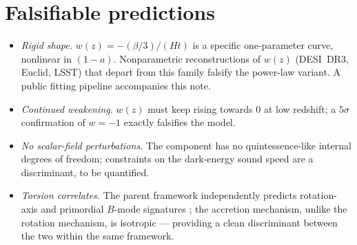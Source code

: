 \documentclass[11pt]{article}
\begin{document}
\section{Falsifiable predictions}
\begin{itemize}
\item[P1.] \emph{Rigid shape.} $w(z) = -(\beta/3)/(Ht)$ is a specific one-parameter curve, nonlinear in $(1-a)$. Nonparametric reconstructions of $w(z)$ (DESI~DR3, Euclid, LSST) that depart from this family falsify the power-law variant. A public fitting pipeline accompanies this note.
\item[P2.] \emph{Continued weakening.} $w(z)$ must keep rising towards $0$ at low redshift; a $5\sigma$ confirmation of $w = -1$ exactly falsifies the model.
\item[P3.] \emph{No scalar-field perturbations.} The component has no quintessence-like internal degrees of freedom; constraints on the dark-energy sound speed are a discriminant, to be quantified.
\item[P4.] \emph{Torsion correlates.} The parent framework independently predicts rotation-axis and primordial $B$-mode signatures \cite{Poplawski2025}; the accretion mechanism, unlike the rotation mechanism, is isotropic --- providing a clean discriminant between the two within the same framework.

\end{itemize}
\end{document}
